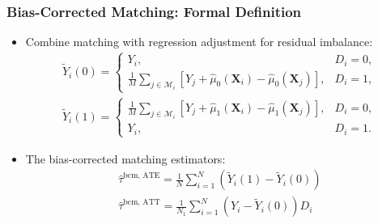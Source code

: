 \documentclass[10pt, handout]{beamer}
\begin{document}
\begin{frame}
  \frametitle{Bias-Corrected Matching: Formal Definition}

  \begin{itemize}
    \item Combine matching with regression adjustment for residual imbalance:
    \begin{align*}
      \tilde{Y}_i(0) = \begin{cases}
        Y_i, & D_i = 0, \\
        \frac{1}{M} \sum_{j \in \mathcal{M}_i} \left[ Y_j + \hat{\mu}_0(\mathbf{X}_i) - \hat{\mu}_0(\mathbf{X}_j) \right], & D_i = 1,
      \end{cases}\\
      \tilde{Y}_i(1) = \begin{cases}
        \frac{1}{M} \sum_{j \in \mathcal{M}_i} \left[ Y_j + \hat{\mu}_1(\mathbf{X}_i) - \hat{\mu}_1(\mathbf{X}_j) \right], & D_i = 0, \\
        Y_i, & D_i = 1.
      \end{cases}
    \end{align*}
    \item The bias-corrected matching estimators:
    \begin{align*}
      \hat{\tau}^{\text{bcm, ATE}} = \frac{1}{N} \sum_{i=1}^N \left( \tilde{Y}_i(1) - \tilde{Y}_i(0) \right)\\
      \hat{\tau}^{\text{bcm, ATT}} = \frac{1}{N_1} \sum_{i=1}^N \left( Y_i - \tilde{Y}_i(0) \right) D_i
    \end{align*}
  \end{itemize}

\end{frame}
\end{document}
